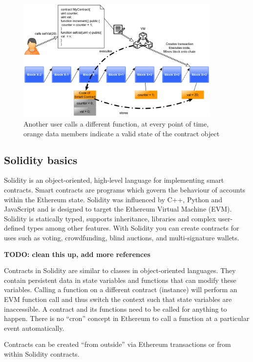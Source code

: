 \documentclass[a4paper]{article}
\begin{document}
\begin{figure}[H]
    \centering
    \includegraphics[width=0.9\textwidth]{figures/deploy_2.png}
    \caption{Another user calls a different function, at every point of time, orange data members indicate a valid state of the contract object}
    \label{fig:deploy_1}
\end{figure}

\subsection{Solidity basics}

Solidity is an object-oriented, high-level language for implementing smart contracts. Smart contracts are programs which govern the behaviour of accounts within the Ethereum state. Solidity was influenced by C++, Python and JavaScript and is designed to target the Ethereum Virtual Machine (EVM).
Solidity is statically typed, supports inheritance, libraries and complex user-defined types among other features. With Solidity you can create contracts for uses such as voting, crowdfunding, blind auctions, and multi-signature wallets.\cite{solidity_manual}

\textbf{TODO: clean this up, add more references}


Contracts in Solidity are similar to classes in object-oriented languages. They contain persistent data in state variables and functions that can modify these variables. Calling a function on a different contract (instance) will perform an EVM function call and thus switch the context such that state variables are inaccessible. A contract and its functions need to be called for anything to happen. There is no “cron” concept in Ethereum to call a function at a particular event automatically.

Contracts can be created “from outside” via Ethereum transactions or from within Solidity contracts.
\end{document}
